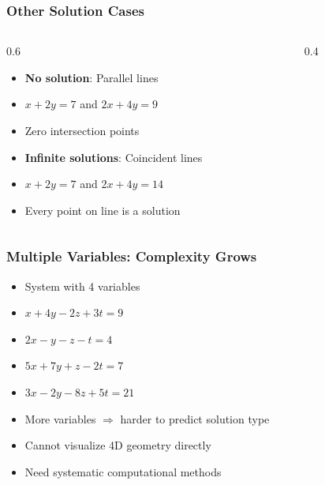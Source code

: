 \begin{frame}[fragile]\frametitle{Other Solution Cases}
  \begin{columns}
    \begin{column}[T]{0.6\linewidth}
      \begin{itemize}
        \item \textbf{No solution}: Parallel lines
        \item $x + 2y = 7$ and $2x + 4y = 9$
        \item Zero intersection points
        \item \textbf{Infinite solutions}: Coincident lines
        \item $x + 2y = 7$ and $2x + 4y = 14$
        \item Every point on line is a solution
      \end{itemize}
    \end{column}
    \begin{column}[T]{0.4\linewidth}
      \begin{center}
      \end{center}
    \end{column}
  \end{columns}
\end{frame}

\begin{frame}[fragile]\frametitle{Multiple Variables: Complexity Grows}
  \begin{itemize}
    \item System with 4 variables
    \item $x + 4y - 2z + 3t = 9$
    \item $2x - y - z - t = 4$
    \item $5x + 7y + z - 2t = 7$
    \item $3x - 2y - 8z + 5t = 21$
    \item More variables $\Rightarrow$ harder to predict solution type
    \item Cannot visualize 4D geometry directly
    \item Need systematic computational methods
  \end{itemize}
\end{frame}

